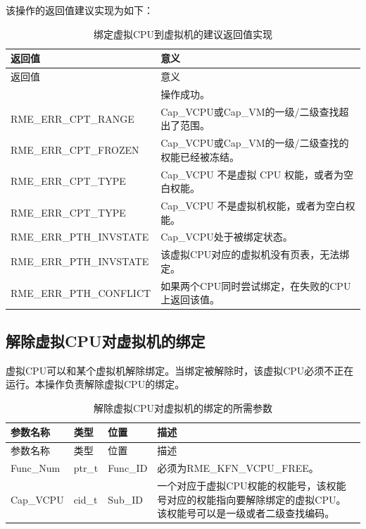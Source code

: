 该操作的返回值建议实现为如下：

\begin{xltabular}{\textwidth}{@{}>{\hsize\raggedright\arraybackslash}X>{\hsize\raggedright\arraybackslash}X@{}}
\caption{绑定虚拟CPU到虚拟机的建议返回值实现}\label{tab:8-84-bind-virtual-cpu-to-virtual-machine-suggested-return-values}\\
\toprule
返回值 & 意义\tabularnewline
\endfirsthead
\toprule
返回值 & 意义\tabularnewline
\midrule
\endhead
\bottomrule
{} & 操作成功。\tabularnewline
    RME\_ERR\_CPT\_RANGE & Cap\_VCPU或Cap\_VM的一级/二级查找超出了范围。\tabularnewline
    RME\_ERR\_CPT\_FROZEN & Cap\_VCPU或Cap\_VM的一级/二级查找的权能已经被冻结。\tabularnewline
    RME\_ERR\_CPT\_TYPE & Cap\_VCPU 不是虚拟 CPU 权能，或者为空白权能。\tabularnewline
    RME\_ERR\_CPT\_TYPE & Cap\_VCPU 不是虚拟机权能，或者为空白权能。\tabularnewline
    RME\_ERR\_PTH\_INVSTATE & Cap\_VCPU处于被绑定状态。\tabularnewline
    RME\_ERR\_PTH\_INVSTATE & 该虚拟CPU对应的虚拟机没有页表，无法绑定。\tabularnewline
    RME\_ERR\_PTH\_CONFLICT & 如果两个CPU同时尝试绑定，在失败的CPU上返回该值。\tabularnewline
\end{xltabular}

\subsection{解除虚拟CPU对虚拟机的绑定}\label{subsec:8-unbind-virtual-cpu-from-virtual-machine}

虚拟CPU可以和某个虚拟机解除绑定。当绑定被解除时，该虚拟CPU必须不正在运行。本操作负责解除虚拟CPU的绑定。

\begin{xltabular}{\textwidth}{@{}>{\hsize\raggedright\arraybackslash}X>{\hsize\raggedright\arraybackslash}X>{\hsize\raggedright\arraybackslash}X>{\hsize\raggedright\arraybackslash}X@{}}
\caption{解除虚拟CPU对虚拟机的绑定的所需参数}\label{tab:8-85-unbind-virtual-cpu-from-virtual-machine-parameters}\\
\toprule
参数名称 & 类型 & 位置 & 描述\tabularnewline
\endfirsthead
\toprule
参数名称 & 类型 & 位置 & 描述\tabularnewline
\midrule
\endhead
\bottomrule
\endlastfoot
Func\_Num & ptr\_t & Func\_ID &
必须为RME\_KFN\_VCPU\_FREE。\tabularnewline
Cap\_VCPU & cid\_t & Sub\_ID &
一个对应于虚拟CPU权能的权能号，该权能号对应的权能指向要解除绑定的虚拟CPU。该权能号可以是一级或者二级查找编码。\tabularnewline
\end{xltabular}


